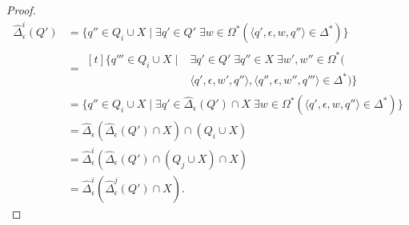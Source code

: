 \begin{proof}
  \begin{align*}
    \hat{\Delta}_\epsilon^i(Q')
     & = \{ q'' \in Q_i \cup X \mid \exists q' \in Q' \; \exists w \in \Omega^*
    (\langle q', \epsilon, w, q'' \rangle \in \Delta^*) \}                        \\
     & = \begin{aligned}[t]
      \{ q''' \in Q_i \cup X \mid & \exists q' \in Q' \; \exists q'' \in X
      \; \exists w', w'' \in \Omega^* (                                                                \\
                                  & \langle q', \epsilon, w', q'' \rangle, \langle q'', \epsilon, w'',
      q''' \rangle \in \Delta^*) \}
    \end{aligned}                                               \\
     & = \{ q'' \in Q_i \cup X \mid \exists q' \in \hat{\Delta}_\epsilon(Q') \cap
    X \; \exists w \in \Omega^* (\langle q', \epsilon, w, q'' \rangle \in
    \Delta^*) \}                                                                  \\
     & = \hat{\Delta}_\epsilon(\hat{\Delta}_\epsilon(Q') \cap X) \cap (Q_i \cup
    X)                                                                            \\
     & = \hat{\Delta}_\epsilon^i(\hat{\Delta}_\epsilon(Q') \cap (Q_j \cup X) \cap
    X)                                                                            \\
     & = \hat{\Delta}_\epsilon^i(\hat{\Delta}_\epsilon^j(Q') \cap X).
  \end{align*}
\end{proof}
\fi
